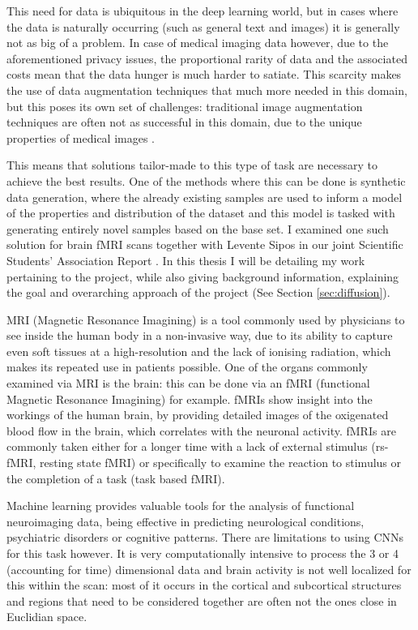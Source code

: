 This need for data is ubiquitous in the deep learning world, but in cases where the data is naturally occurring (such as general text and images) it is generally not as big of a problem. In case of medical imaging data however, due to the aforementioned privacy issues, the proportional rarity of data and the associated costs mean that the data hunger is much harder to satiate. This scarcity makes the use of data augmentation techniques that much more needed in this domain, but this poses its own set of challenges: traditional image augmentation techniques are often not as successful in this domain, due to the unique properties of medical images \cite{garcea2023data}. 

This means that solutions tailor-made to this type of task are necessary to achieve the best results. One of the methods where this can be done is synthetic data generation, where the already existing samples are used to inform a model of the properties and distribution of the dataset and this model is tasked with generating entirely novel samples based on the base set. I examined one such solution for brain fMRI scans together with Levente Sipos in our joint Scientific Students’ Association Report \cite{tdk}. In this thesis I will be detailing my work pertaining to the project, while also giving background information, explaining the goal and overarching approach of the project (See Section \ref{sec:diffusion}).

MRI (Magnetic Resonance Imagining) is a tool commonly used by physicians to see inside the human body in a non-invasive way, due to its ability to capture even soft tissues at a high-resolution and the lack of ionising radiation, which makes its repeated use in patients possible. One of the organs commonly examined via MRI is the brain: this can be done via an fMRI (functional Magnetic Resonance Imagining) for example. fMRIs show insight into the workings of the human brain, by providing detailed images of the oxigenated blood flow in the brain, which correlates with the neuronal activity. fMRIs are commonly taken either for a longer time with a lack of external stimulus (rs-fMRI, resting state fMRI) or specifically to examine the reaction to stimulus or the completion of a task (task based fMRI).

Machine learning provides valuable tools for the analysis of functional neuroimaging data, being effective in predicting neurological conditions, psychiatric disorders or cognitive patterns. There are limitations to using CNNs for this task however. It is very computationally intensive to process the 3 or 4 (accounting for time) dimensional data and brain activity is not well localized for this within the scan: most of it occurs in the cortical and subcortical structures and regions that need to be considered together are often not the ones close in Euclidian space.

